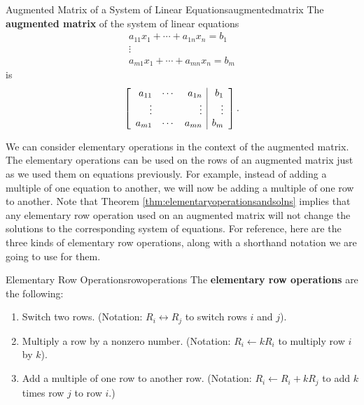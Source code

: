 \begin{definition}{Augmented Matrix of a System of Linear Equations}{augmentedmatrix}
  The \textbf{augmented matrix}
  of the system of linear equations
  \begin{equation*}
    \begin{array}{c}
      a_{11}x_{1}+\cdots +a_{1n}x_{n}=b_{1} \\
      \vdots \\
      a_{m1}x_{1}+\cdots +a_{mn}x_{n}=b_{m}
    \end{array}
  \end{equation*}
  is
  \begin{equation*}
    \left[
    \begin{array}{rrr|r}
      a_{11} & \cdots & a_{1n} &  b_{1} \\
      \vdots &  & \vdots &  \vdots \\
      a_{m1} & \cdots & a_{mn} &  b_{m}
    \end{array}
    \right].
  \end{equation*}
\end{definition}

We can consider elementary operations in the context of the augmented
matrix. The elementary operations can be used on the rows of an
augmented matrix just as we used them on equations previously. For
example, instead of adding a multiple of one equation to another, we
will now be adding a multiple of one row to another. Note that Theorem
\ref{thm:elementaryoperationsandsolns} implies that any elementary row
operation used on an augmented matrix will not change the solutions
to the corresponding system of equations. For reference, here are the
three kinds of elementary row operations, along with a shorthand
notation we are going to use for them.

\begin{definition}{Elementary Row Operations}{rowoperations}
  The \textbf{elementary row operations} are the following:
   

  \begin{enumerate}
  \item Switch two rows. (Notation: $R_i\leftrightarrow R_j$ to switch
    rows $i$ and $j$).
    
  \item Multiply a row by a nonzero number.  (Notation: $R_i\leftarrow
    kR_i$ to multiply row $i$ by $k$).    
    
  \item Add a multiple of one row to another row. (Notation:
    $R_i\leftarrow R_i+kR_j$ to add $k$ times row $j$ to row $i$.)
  \end{enumerate}
\end{definition}

